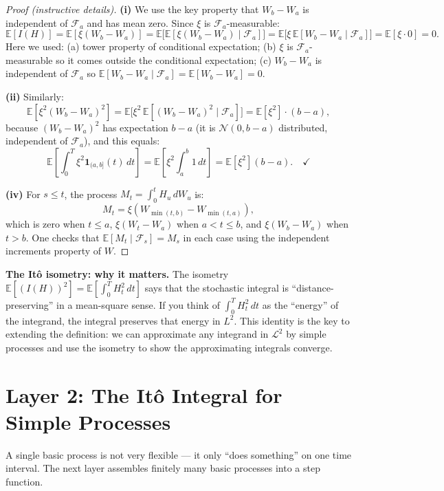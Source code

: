 \documentclass[11pt,a4paper]{article}
\theoremstyle{definition}
\theoremstyle{plain}
\theoremstyle{remark}
\newcommand{\E}{\mathbb{E}}
\newcommand{\F}{\mathcal{F}}
\newcommand{\calL}{\mathcal{L}}
\begin{document}
\begin{proof}[Proof (instructive details)]
\textbf{(i)} We use the key property that $W_b - W_a$ is independent of $\F_a$ and has mean zero. Since $\xi$ is $\F_a$-measurable:
\[
  \E[I(H)] = \E[\xi(W_b - W_a)] = \E\bigl[\E[\xi(W_b-W_a)\mid\F_a]\bigr] = \E\bigl[\xi\,\E[W_b-W_a\mid\F_a]\bigr] = \E[\xi \cdot 0] = 0.
\]
Here we used: (a) tower property of conditional expectation; (b) $\xi$ is $\F_a$-measurable so it comes outside the conditional expectation; (c) $W_b - W_a$ is independent of $\F_a$ so $\E[W_b - W_a \mid \F_a] = \E[W_b - W_a] = 0$.

\textbf{(ii)} Similarly:
\[
  \E[\xi^2(W_b-W_a)^2] = \E\bigl[\xi^2\,\E[(W_b-W_a)^2\mid\F_a]\bigr] = \E[\xi^2]\cdot(b-a),
\]
because $(W_b - W_a)^2$ has expectation $b - a$ (it is $\mathcal{N}(0,b-a)$ distributed, independent of $\F_a$), and this equals:
\[
  \E\left[\int_0^T \xi^2 \mathbf{1}_{(a,b]}(t)\,dt\right] = \E\left[\xi^2\int_a^b 1\,dt\right] = \E[\xi^2](b-a). \quad\checkmark
\]

\textbf{(iv)} For $s \leq t$, the process $M_t = \int_0^t H_u\,dW_u$ is:
\[
  M_t = \xi(W_{\min(t,b)} - W_{\min(t,a)}),
\]
which is zero when $t \leq a$, $\xi(W_t - W_a)$ when $a < t \leq b$, and $\xi(W_b - W_a)$ when $t > b$.
One checks that $\E[M_t \mid \F_s] = M_s$ in each case using the independent increments property of $W$.
\end{proof}

\begin{tutobox}
\textbf{The Itô isometry: why it matters.}
The isometry $\E[(I(H))^2] = \E[\int_0^T H_t^2\,dt]$ says that the stochastic integral is ``distance-preserving'' in a mean-square sense. If you think of $\int_0^T H_t^2\,dt$ as the ``energy'' of the integrand, the integral preserves that energy in $L^2$. This identity is the key to extending the definition: we can approximate any integrand in $\calL^2$ by simple processes and use the isometry to show the approximating integrals converge.
\end{tutobox}

\section{Layer 2: The Itô Integral for Simple Processes}
\label{sec:simple}

A single basic process is not very flexible — it only ``does something'' on one time interval. The next layer assembles finitely many basic processes into a step function.
\end{document}
